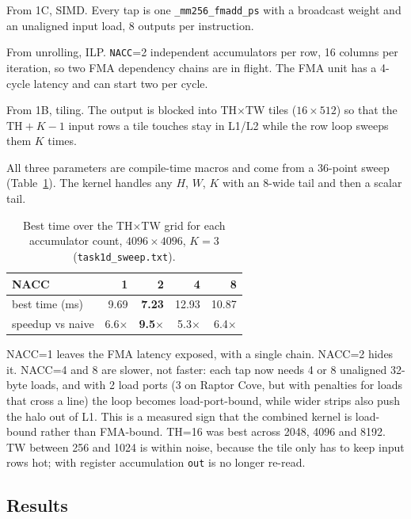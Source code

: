 \documentclass[11pt,a4paper]{article}
\begin{document}
From 1C, SIMD. Every tap is one \texttt{\_mm256\_fmadd\_ps} with a broadcast weight and an unaligned input load, 8 outputs per instruction.

From unrolling, ILP. \texttt{NACC}=2 independent accumulators per row, 16 columns per iteration, so two FMA dependency chains are in flight. The FMA unit has a 4-cycle latency and can start two per cycle.

From 1B, tiling. The output is blocked into TH$\times$TW tiles ($16\times512$) so that the $\text{TH}+K-1$ input rows a tile touches stay in L1/L2 while the row loop sweeps them $K$ times.

All three parameters are compile-time macros and come from a 36-point sweep (Table~\ref{tab:nacc}). The kernel handles any $H$, $W$, $K$ with an 8-wide tail and then a scalar tail.

\begin{table}[H]
\centering\small
\caption{Best time over the TH$\times$TW grid for each accumulator count, $4096\times4096$, $K=3$ (\texttt{task1d\_sweep.txt}).}
\label{tab:nacc}
\begin{tabular}{lrrrr}
\toprule
NACC & 1 & 2 & 4 & 8 \\
\midrule
best time (ms)          & 9.69 & \textbf{7.23} & 12.93 & 10.87 \\
speedup vs naive        & 6.6$\times$ & \textbf{9.5$\times$} & 5.3$\times$ & 6.4$\times$ \\
\bottomrule
\end{tabular}
\end{table}

NACC=1 leaves the FMA latency exposed, with a single chain. NACC=2 hides it. NACC=4 and 8 are slower, not faster: each tap now needs 4 or 8 unaligned 32-byte loads, and with 2 load ports (3 on Raptor Cove, but with penalties for loads that cross a line) the loop becomes load-port-bound, while wider strips also push the halo out of L1. This is a measured sign that the combined kernel is load-bound rather than FMA-bound. TH=16 was best across 2048, 4096 and 8192. TW between 256 and 1024 is within noise, because the tile only has to keep input rows hot; with register accumulation \texttt{out} is no longer re-read.

\subsection{Results}
\end{document}
